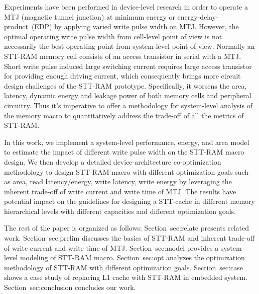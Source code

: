 Experiments have been performed in device-level research in order to operate a MTJ (magnetic tunnel junction) at minimum energy or energy-delay-product~(EDP) by applying varied write pulse width on MTJ. However, the optimal operating write pulse width from cell-level point of view is not necessarily the best operating point from system-level point of view. Normally an STT-RAM memory cell consists of an access transistor in serial with a MTJ. Short write pulse induced large switching current requires large access transistor for providing enough driving current, which consequently brings more circuit design challenges of the STT-RAM prototype. Specifically, it worsens the area, latency, dynamic energy and leakage power of both memory cells and peripheral circuitry.  Thus it's imperative to offer a methodology for system-level analysis of the memory macro to quantitatively address the trade-off of all the metrics of STT-RAM.

In this work, we implement a system-level performance, energy, and area model to estimate the impact of different write pulse width on the STT-RAM macro design. We then develop a detailed device-architecture co-optimization methodology to design STT-RAM macro with different optimization goals such as area, read latency/energy, write latency, write energy by leveraging the inherent trade-off of write current and write time of MTJ. The results have potential impact on the guidelines for designing a STT-cache in different memory hierarchical levels with different capacities and different optimization goals.

The rest of the paper is organized as follows: Section~{sec:relate} presents related work. Section~{sec:prelim} discusses the basics of STT-RAM and inherent trade-off of write current and write time of MTJ. Section~{sec:model} provides a system-level modeling of STT-RAM macro. Section~{sec:opt} analyzes the optimization methodology of STT-RAM with different optimization goals. Section~{sec:case} shows a case study of replacing L1 cache with STT-RAM in embedded system. Section~{sec:conclusion} concludes our work.

\begin{comment}
Comment Paragraph
\end{comment} 